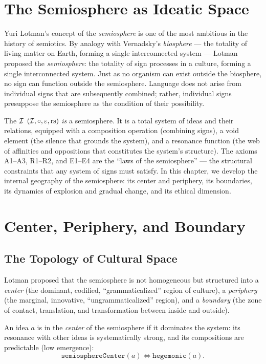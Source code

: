 \section{The Semiosphere as Ideatic Space}

Yuri Lotman's concept of the \emph{semiosphere} is one of the most
ambitious in the history of semiotics. By analogy with Vernadsky's
\emph{biosphere} --- the totality of living matter on Earth, forming a
single interconnected system --- Lotman proposed the \emph{semiosphere}:
the totality of sign processes in a culture, forming a single
interconnected system. Just as no organism can exist outside the
biosphere, no sign can function outside the semiosphere. Language does
not arise from individual signs that are subsequently combined; rather,
individual signs presuppose the semiosphere as the condition of their
possibility.

The $\mathcal{I}$ $(\mathcal{I}, \circ, \varepsilon, \mathrm{rs})$ \emph{is} a
semiosphere. It is a total system of ideas and their relations,
equipped with a composition operation (combining signs), a void
element (the silence that grounds the system), and a resonance
function (the web of affinities and oppositions that constitutes the
system's structure). The axioms A1--A3, R1--R2, and E1--E4 are the
``laws of the semiosphere'' --- the structural constraints that any
system of signs must satisfy. In this chapter, we develop the internal
geography of the semiosphere: its center and periphery, its boundaries,
its dynamics of explosion and gradual change, and its ethical
dimension.

\section{Center, Periphery, and Boundary}

\subsection{The Topology of Cultural Space}

Lotman proposed that the semiosphere is not homogeneous but structured
into a \emph{center} (the dominant, codified, ``grammaticalized'' region
of culture), a \emph{periphery} (the marginal, innovative,
``ungrammaticalized'' region), and a \emph{boundary} (the zone of
contact, translation, and transformation between inside and outside).

\begin{definition}
\label{def:center}
An idea $a$ is in the \emph{center} of the semiosphere if it
dominates the system: its resonance with other ideas is systematically
strong, and its compositions are predictable (low emergence):
\[
  \texttt{semiosphereCenter}(a) \iff \texttt{hegemonic}(a).
\]
\end{definition}

